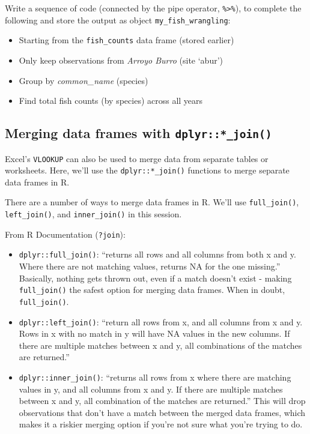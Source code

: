 \documentclass[]{book}
\providecommand{\tightlist}{%
  \setlength{\itemsep}{0pt}\setlength{\parskip}{0pt}}
\begin{document}
Write a sequence of code (connected by the pipe operator, \texttt{\%\textgreater{}\%}), to complete the following and store the output as object \texttt{my\_fish\_wrangling}:

\begin{itemize}
\tightlist
\item
  Starting from the \texttt{fish\_counts} data frame (stored earlier)
\item
  Only keep observations from \emph{Arroyo Burro} (site `abur')
\item
  Group by \emph{common\_name} (species)
\item
  Find total fish counts (by species) across all years
\end{itemize}

\hypertarget{merging-data-frames-with-dplyr_join}{%
\subsection{\texorpdfstring{Merging data frames with \texttt{dplyr::*\_join()}}{Merging data frames with dplyr::*\_join()}}\label{merging-data-frames-with-dplyr_join}}

Excel's \texttt{VLOOKUP} can also be used to merge data from separate tables or worksheets. Here, we'll use the \texttt{dplyr::*\_join()} functions to merge separate data frames in R.

There are a number of ways to merge data frames in R. We'll use \texttt{full\_join()}, \texttt{left\_join()}, and \texttt{inner\_join()} in this session.

From R Documentation (\texttt{?join}):

\begin{itemize}
\item
  \texttt{dplyr::full\_join()}: ``returns all rows and all columns from both x and y. Where there are not matching values, returns NA for the one missing.'' Basically, nothing gets thrown out, even if a match doesn't exist - making \texttt{full\_join()} the safest option for merging data frames. When in doubt, \texttt{full\_join()}.
\item
  \texttt{dplyr::left\_join()}: ``return all rows from x, and all columns from x and y. Rows in x with no match in y will have NA values in the new columns. If there are multiple matches between x and y, all combinations of the matches are returned.''
\item
  \texttt{dplyr::inner\_join()}: ``returns all rows from x where there are matching values in y, and all columns from x and y. If there are multiple matches between x and y, all combination of the matches are returned.'' This will drop observations that don't have a match between the merged data frames, which makes it a riskier merging option if you're not sure what you're trying to do.
\end{itemize}
\end{document}
